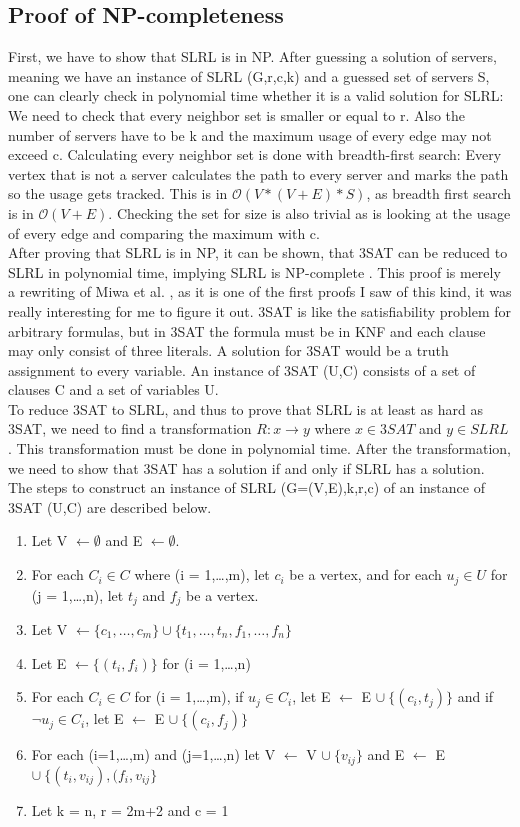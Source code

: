 \documentclass [12pt]{article}
\begin{document}
\subsection{Proof of NP-completeness}
First, we have to show that SLRL is in NP. After guessing a solution of servers, meaning we 
have an instance of SLRL (G,r,c,k) and a guessed set of servers S, one can clearly check 
in polynomial time whether it is a valid solution for SLRL: We need to check that every neighbor set is smaller
or equal to r. Also the number of servers have to be k and the maximum usage of every edge may not exceed c.
Calculating every neighbor set is done with breadth-first search: Every vertex that is not a server calculates
the path to every server and marks the path so the usage gets tracked. This is in $\mathcal{O}(V*(V+E)*S)$, as breadth first
search is in $\mathcal{O}(V+E)$. Checking the set for size is also trivial as is looking at the usage of
every edge and comparing the maximum with c.\\
After proving that SLRL is in NP, it can be shown, that 3SAT can be reduced to SLRL in polynomial time,
implying SLRL is NP-complete \cite{Garey:1979:CIG:578533}.
This proof is merely a rewriting of Miwa et al. \cite{mirrorserver}, as it is one of the first proofs I saw of 
this kind, it was really interesting for me to figure it out.
3SAT is like the satisfiability problem for arbitrary formulas, but in 3SAT the formula must be in KNF and 
each clause may only consist of three literals. A solution for 3SAT would be a truth assignment to every
variable. An instance of 3SAT (U,C) consists of a set of clauses C and a set of variables U.\\
To reduce 3SAT to SLRL, and thus to prove that SLRL is at least as hard as 3SAT, we need to find a 
transformation $R: x \rightarrow y$ where $x \in 3SAT$ and $y \in SLRL$. This transformation must be 
done in polynomial time. After the transformation, we need to show that 3SAT has a solution if and only if 
SLRL has a solution.\\
The steps to construct an instance of SLRL (G=(V,E),k,r,c) of an instance of 3SAT (U,C) are described below.
\begin{enumerate}
  \item{Let V $\leftarrow \emptyset$ and E $\leftarrow \emptyset$.}
  \item{For each $C_i \in C$ where (i = 1,\dots,m), let $c_i$ be a vertex, and for each $u_j \in U$ for (j = 1,\dots,n),
    let $t_j$ and $f_j$ be a vertex.}
  \item {Let V $\leftarrow \{c_1, \dots, c_m\} \cup \{t_1, \dots, t_n, f_1, \dots, f_n\} $ }
  \item {Let E $\leftarrow \{(t_i,f_i)\}$ for (i = 1,\dots,n) }
  \item {For each $C_i \in C$ for (i = 1,\dots,m), if $u_j \in C_i$, let E $\leftarrow$ E $\cup \ \{ (c_i ,t_j) \}$
    and if $\neg u_j \in C_i$, let E $\leftarrow$ E $\cup \ \{(c_i,f_j)\}$ }
  \item{For each (i=1,\dots,m) and (j=1,\dots,n) let V $\leftarrow$  V $\cup \ \{v_{ij}\}$ and E $\leftarrow$ E $\cup \ \{(t_i,v_{ij}), (f_i, v_{ij} \}$ }
  \item{Let k = n, r = 2m+2 and c = 1}
\end{enumerate}
\end{document}
